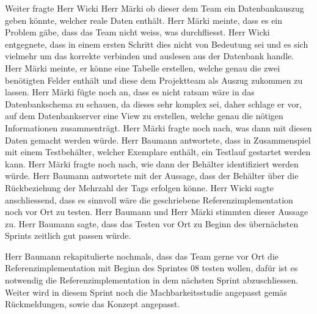 \documentclass[parskip=full, a4paper]{scrreprt}
\begin{document}
Weiter fragte Herr Wicki Herr Märki ob dieser dem Team ein Datenbankauszug geben könnte, welcher reale Daten enthält. Herr Märki meinte, dass es ein Problem gäbe, dass das Team nicht weiss, was durchfliesst. Herr Wicki entgegnete, dass in einem ersten Schritt dies nicht von Bedeutung sei und es sich vielmehr um das korrekte verbinden und auslesen aus der Datenbank handle. Herr Märki meinte, er könne eine Tabelle erstellen, welche genau die zwei benötigten Felder enthält und diese dem Projektteam als Auszug zukommen zu lassen. Herr Märki fügte noch an, dass es nicht ratsam wäre in das Datenbankschema zu schauen, da dieses sehr komplex sei, daher schlage er vor, auf dem Datenbankserver eine View zu erstellen, welche genau die nötigen Informationen zusammenträgt. Herr Märki fragte noch nach, was dann mit diesen Daten gemacht werden würde. Herr Baumann antwortete, dass in Zusammenspiel mit einem Testbehälter, welcher Exemplare enthält, ein Testlauf gestartet werden kann. Herr Märki fragte noch nach, wie dann der Behälter identifiziert werden würde. Herr Baumann antwortete mit der Aussage, dass der Behälter über die Rückbeziehung der Mehrzahl der Tags erfolgen könne. Herr Wicki sagte anschliessend, dass es sinnvoll wäre die geschriebene Referenzimplementation noch vor Ort zu testen. Herr Baumann und Herr Märki stimmten dieser Aussage zu. Herr Baumann sagte, dass das Testen vor Ort zu Beginn des übernächsten Sprints zeitlich gut passen würde.

Herr Baumann rekapitulierte nochmals, dass das Team gerne vor Ort die Referenzimplementation mit Beginn des Sprintes 08 testen wollen, dafür ist es notwendig die Referenzimplementation in dem nächsten Sprint abzuschliessen. Weiter wird in diesem Sprint noch die Machbarkeitsstudie angepasst gemäs Rückmeldungen, sowie das Konzept angepasst.
\end{document}
